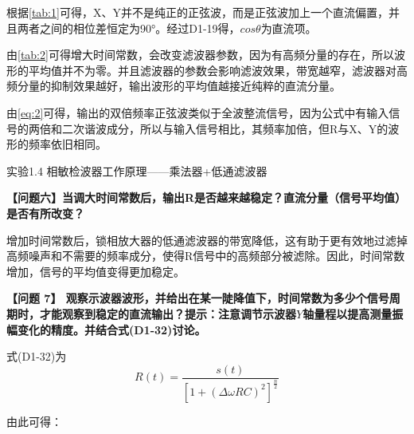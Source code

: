 \documentclass[dvipsnames, svgnames,a4paper,11pt]{article}
\begin{document}
	根据\ref{tab:1}可得，X、Y并不是纯正的正弦波，而是正弦波加上一个直流偏置，并且两者之间的相位差恒定为90°。经过D1-19得，$cos\theta$为直流项。

	由\ref{tab:2}可得增大时间常数，会改变滤波器参数，因为有高频分量的存在，所以波形的平均值并不为零。并且滤波器的参数会影响滤波效果，带宽越窄，滤波器对高频分量的抑制效果越好，输出波形的平均值越接近纯粹的直流分量。

	由\ref{eq:2}可得，输出的双倍频率正弦波类似于全波整流信号，因为公式中有输入信号的两倍和二次谐波成分，所以与输入信号相比，其频率加倍，但R与X、Y的波形的频率依旧相同。

	实验1.4 \quad   相敏检波器工作原理——乘法器+低通滤波器

	\textbf{【问题六】当调大时间常数后，输出R是否越来越稳定？直流分量（信号平均值）是否有所改变？}

	增加时间常数后，锁相放大器的低通滤波器的带宽降低，这有助于更有效地过滤掉高频噪声和不需要的频率成分，使得R信号中的高频部分被滤除。因此，时间常数增加，信号的平均值变得更加稳定。

	\textbf{【问题 7】 观察示波器波形，并给出在某一陡降值下，时间常数为多少个信号周期时，才能观察到稳定的直流输出？提示：注意调节示波器$Y$轴量程以提高测量振幅变化的精度。并结合式(D1-32)讨论。}

	式(D1-32)为
		\[
			R(t) = \frac{s(t)}{[1 + (\Delta\omega R C)^2]^{\frac{n}{2}}}
		\]

		由此可得：
\end{document}
